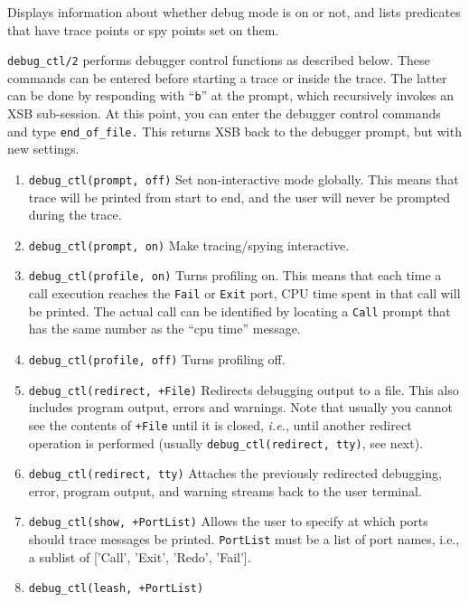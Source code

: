 \begin{description}
 
    Displays information about whether debug mode is on or not, and lists
    predicates that have trace points or spy points set on them.

 
   {\tt debug\_ctl/2} performs debugger control functions as described below.
   These commands can be entered before starting a trace or inside the trace.
   The latter can be done by responding with ``{\tt b}'' at the prompt,
   which recursively invokes an XSB sub-session. At this point, you can
   enter the debugger control commands and type \verb|end_of_file.| This
   returns XSB back to the debugger prompt, but with new settings.
   \begin{enumerate}
   \item {\tt debug\_ctl(prompt, off)} Set non-interactive mode globally.
     This means that trace will be printed from start to end, and the user
     will never be prompted during the trace.
    \item {\tt debug\_ctl(prompt, on)} 
      Make tracing/spying interactive.
    \item {\tt debug\_ctl(profile, on)}  
      Turns profiling on. This means that each time a call execution
      reaches the {\tt Fail} or {\tt Exit} port, CPU time spent in that
      call will be printed. The actual call can be identified by locating a
      {\tt Call}  prompt that has the same number as the ``cpu time''
      message.
    \item {\tt debug\_ctl(profile, off)}  
      Turns profiling off.
    \item {\tt debug\_ctl(redirect, +File)} 
      Redirects debugging output to a file. This also includes program output,
      errors and warnings.
      Note that usually you cannot see the contents of {\tt +File} until it
      is closed, {\it i.e.}, until another redirect operation is performed
      (usually {\tt debug\_ctl(redirect, tty)}, see next).
    \item {\tt debug\_ctl(redirect, tty)}     
      Attaches the previously redirected debugging, error, program output,
      and warning streams back to the user terminal.
    \item {\tt debug\_ctl(show, +PortList)}  
      Allows the user to specify at which ports should trace messages be
      printed. {\tt PortList} must be a list of port names, i.e., a sublist
      of ['Call', 'Exit', 'Redo', 'Fail']. 
    \item {\tt debug\_ctl(leash, +PortList)}  

\end{enumerate}
\end{description}
